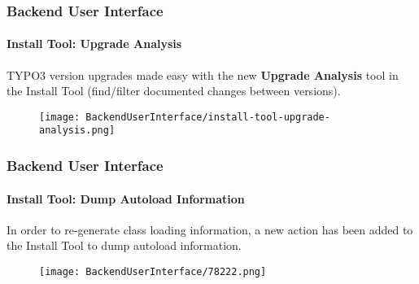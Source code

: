 \begin{frame}[fragile]
	\frametitle{Backend User Interface}
	\framesubtitle{Install Tool: Upgrade Analysis}


	TYPO3 version upgrades made easy with the new \textbf{Upgrade Analysis} tool
	in the Install Tool (find/filter documented changes between versions).

	\begin{figure}
		\texttt{[image: BackendUserInterface/install-tool-upgrade-analysis.png]}
	\end{figure}

\end{frame}


\begin{frame}[fragile]
	\frametitle{Backend User Interface}
	\framesubtitle{Install Tool: Dump Autoload Information}

	In order to re-generate class loading information, a new action has been added
	to the Install Tool to dump autoload information.

	\begin{figure}
		\texttt{[image: BackendUserInterface/78222.png]}
	\end{figure}

\end{frame}


